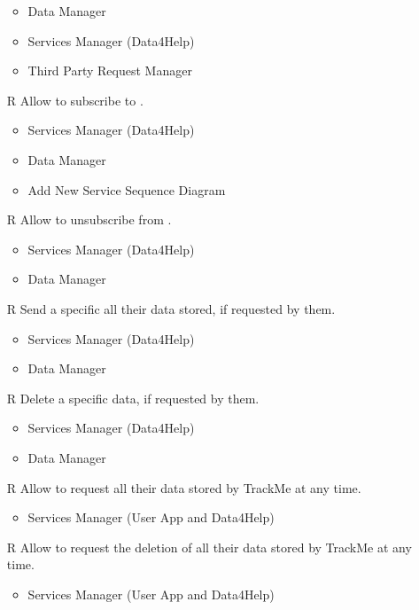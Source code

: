 \begin{itemize}
\begin{itemize}
		\item Data Manager
		\item Services Manager (Data4Help)
		\item Third Party Request Manager
	\end{itemize}
	\item[R\subs{30}]Allow  to subscribe to .
	\begin{itemize}
		\item Services Manager (Data4Help)
		\item Data Manager
		\item Add New Service Sequence Diagram
	\end{itemize}
	\item[R\subs{31}]Allow  to unsubscribe from .
	\begin{itemize}
		\item Services Manager (Data4Help)
		\item Data Manager
	\end{itemize}
	\item[R\subs{32}]Send a specific  all their data stored, if requested by them.
	\begin{itemize}
		\item Services Manager (Data4Help)
		\item Data Manager
	\end{itemize}
	\item[R\subs{33}]Delete a  specific data, if requested by them.
	\begin{itemize}
		\item Services Manager (Data4Help)
		\item Data Manager
	\end{itemize}
	\item[R\subs{34}]Allow  to request all their data stored by TrackMe at any time.
	\begin{itemize}
		\item Services Manager (User App and Data4Help)
	\end{itemize}
	\item[R\subs{35}]Allow  to request the deletion of all their data stored by TrackMe at any time.
	\begin{itemize}
		\item Services Manager (User App and Data4Help)
	\end{itemize}
\end{itemize}


